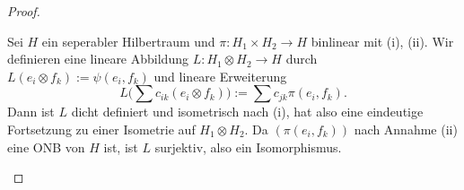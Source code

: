 \documentclass{mycourse}
\begin{document}
\begin{proof}
\begin{seg}[Eindeutigkeit]
Sei $H$ ein seperabler Hilbertraum und $\pi:H_1 \times H_2 \to H$ binlinear mit (i), (ii). Wir definieren eine lineare Abbildung $L: H_1 \otimes H_2 \to H$ durch $
L(e_i \otimes f_k) := \psi(e_i, f_k)
$
und lineare Erweiterung
\[
L\big (\sum c_{ik} (e_i \otimes f_k)\big) := \sum c_{jk} \pi(e_i, f_k).
\]
Dann ist $L$ dicht definiert und isometrisch nach (i), hat also eine eindeutige Fortsetzung zu einer Isometrie auf $H_1 \otimes H_2$. Da $(\pi(e_i, f_k))$ nach Annahme (ii) eine ONB von $H$ ist, ist $L$ surjektiv, also ein Isomorphismus. 
\end{seg}
\end{proof}
\end{document}
